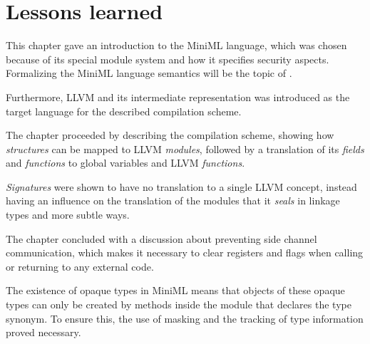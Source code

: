 \section{Lessons learned}

This chapter gave an introduction to the \mbox{MiniML} language, which was chosen because of its special module system and how it specifies security aspects. Formalizing the \mbox{MiniML} language semantics will be the topic of .

Furthermore, LLVM and its intermediate representation was introduced as the target language for the described compilation scheme.

The chapter proceeded by describing the compilation scheme, showing how \emph{structures} can be mapped to LLVM \emph{modules}, followed by a translation of its \emph{fields} and \emph{functions} to global variables and LLVM \emph{functions}.

\emph{Signatures} were shown to have no translation to a single LLVM concept, instead having an influence on the translation of the modules that it \emph{seals} in linkage types and more subtle ways.

The chapter concluded with a discussion about preventing side channel communication, which makes it necessary to clear registers and flags when calling or returning to any external code.

The existence of opaque types in \mbox{MiniML} means that objects of these opaque types can only be created by methods inside the module that declares the type synonym. To ensure this, the use of masking and the tracking of type information proved necessary.
